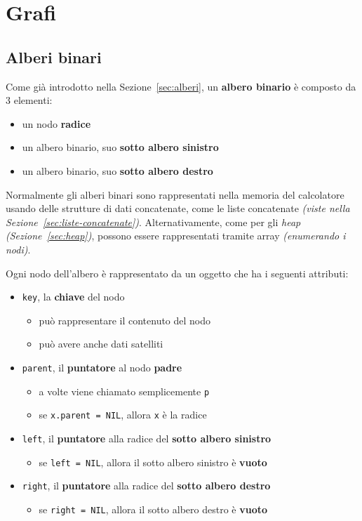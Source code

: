 \documentclass[italian, 10pt]{article}
\begin{document}
\section{Grafi}
\label{sec:grafi}

\subsection{Alberi binari}

Come già introdotto nella Sezione~\ref{sec:alberi}, un \textbf{albero binario} è composto da \(3\) elementi:

\begin{itemize}
  \item un nodo \textbf{radice}
  \item un albero binario, suo \textbf{sotto albero sinistro}
  \item un albero binario, suo \textbf{sotto albero destro}
\end{itemize}

Normalmente gli alberi binari sono rappresentati nella memoria del calcolatore usando delle strutture di dati concatenate, come le liste concatenate \textit{(viste nella Sezione~\ref{sec:liste-concatenate})}.
Alternativamente, come per gli \textit{heap} \textit{(Sezione~\ref{sec:heap})}, possono essere rappresentati tramite array \textit{(enumerando i nodi)}.

Ogni nodo dell'albero è rappresentato da un oggetto che ha i seguenti attributi:

\begin{itemize}
  \item \texttt{key}, la \textbf{chiave} del nodo
        \begin{itemize}
          \item può rappresentare il contenuto del nodo
          \item può avere anche dati satelliti
        \end{itemize}
  \item \texttt{parent}, il \textbf{puntatore} al nodo \textbf{padre}
        \begin{itemize}
          \item a volte viene chiamato semplicemente \texttt{p}
          \item se \texttt{x.parent = NIL}, allora \texttt{x} è la radice
        \end{itemize}
  \item \texttt{left}, il \textbf{puntatore} alla radice del \textbf{sotto albero sinistro}
        \begin{itemize}
          \item se \texttt{left = NIL}, allora il sotto albero sinistro è \textbf{vuoto}
        \end{itemize}
  \item \texttt{right}, il \textbf{puntatore} alla radice del \textbf{sotto albero destro}
  \begin{itemize}
          \item se \texttt{right = NIL}, allora il sotto albero destro è \textbf{vuoto}
        \end{itemize}
\end{itemize}
\end{document}
